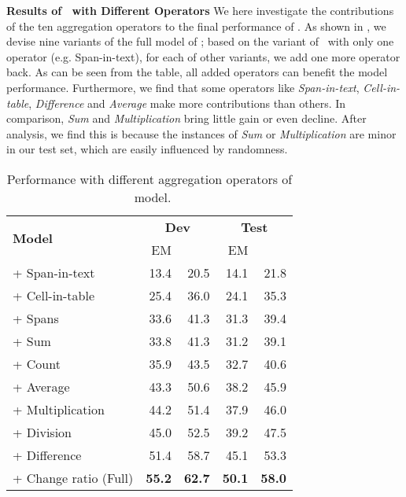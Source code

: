 \noindent \textbf{Results of \tagop~with Different Operators}
We here investigate the contributions of the ten aggregation operators to the final performance of \tagop.
As shown in , we devise nine variants of the full model of \tagop; based on the variant of \tagop~with only one operator (e.g. Span-in-text), for each of other variants, we add one more operator back.
As can be seen from the table, all added operators can benefit the model performance.
Furthermore, we find that some operators like \emph{Span-in-text}, \emph{Cell-in-table}, \emph{Difference} and \emph{Average} make more contributions than others.
In comparison, \emph{Sum} and \emph{Multiplication} bring little gain or even decline.
After analysis, we find this is because the instances of \emph{Sum} or \emph{Multiplication} are minor in our test set, which are easily influenced by randomness.

\begin{table}
    \small
    \centering
    \begin{tabular}{lrrrr}
    \toprule
     \multirow{2}{*}{\bf Model}    & \multicolumn{2}{c}{\bf Dev} & \multicolumn{2}{c}{\bf Test} \\
     \cmidrule(lr){2-3}
     \cmidrule(lr){4-5}
         & EM & \fone{} & EM&  \fone{}\\
    \midrule
    + Span-in-text & 13.4 & 20.5 & 14.1 & 21.8 \\
    + Cell-in-table & 25.4 & 36.0 & 24.1 & 35.3 \\
    + Spans & 33.6 & 41.3 & 31.3 & 39.4 \\
    + Sum & 33.8 & 41.3 & 31.2 & 39.1 \\
    + Count & 35.9 & 43.5 & 32.7 & 40.6 \\
    + Average & 43.3 & 50.6 & 38.2 & 45.9 \\
    + Multiplication & 44.2 & 51.4 & 37.9 & 46.0 \\
    + Division & 45.0 & 52.5 & 39.2 & 47.5 \\
    + Difference & 51.4 & 58.7 & 45.1 & 53.3 \\
    + Change ratio (Full) & \bf 55.2 & \bf 62.7 & \bf 50.1 & \bf 58.0 \\
    \bottomrule
    \end{tabular}
    \caption{Performance with different aggregation operators of \tagop~model.}
    \label{tab:op-ablation}
\end{table}


